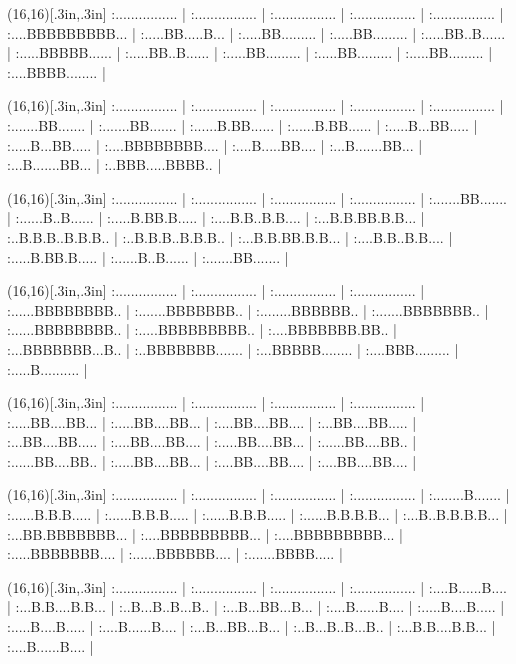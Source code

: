 \sprite{\Fuel}(16,16)[.3in,.3in]
:................ |
:................ |
:................ |
:................ |
:................ |
:....BBBBBBBBB... |
:.....BB.....B... |
:.....BB......... |
:.....BB......... |
:.....BB..B...... |
:.....BBBBB...... |
:.....BB..B...... |
:.....BB......... |
:.....BB......... |
:.....BB......... |
:....BBBB........ |
\endsprite


\sprite{\Armor}(16,16)[.3in,.3in]
:................ |
:................ |
:................ |
:................ |
:................ |
:.......BB....... |
:.......BB....... |
:......B.BB...... |
:......B.BB...... |
:.....B...BB..... |
:.....B...BB..... |
:....BBBBBBBB.... |
:....B.....BB.... |
:...B.......BB... |
:...B.......BB... |
:..BBB.....BBBB.. |
\endsprite

\sprite{\Goal}(16,16)[.3in,.3in]
:................ |
:................ |
:................ |
:................ |
:.......BB....... |
:......B..B...... |
:.....B.BB.B..... |
:....B.B..B.B.... |
:...B.B.BB.B.B... |
:..B.B.B..B.B.B.. |
:..B.B.B..B.B.B.. |
:...B.B.BB.B.B... |
:....B.B..B.B.... |
:.....B.BB.B..... |
:......B..B...... |
:.......BB....... |
\endsprite


\sprite{\Scroll}(16,16)[.3in,.3in]
:................ |
:................ |
:................ |
:................ |
:......BBBBBBBB.. |
:.......BBBBBBB.. |
:........BBBBBB.. |
:.......BBBBBBB.. |
:......BBBBBBBB.. |
:.....BBBBBBBBB.. |
:....BBBBBBB.BB.. |
:...BBBBBBB...B.. |
:..BBBBBBB....... |
:...BBBBB........ |
:....BBB......... |
:.....B.......... |
\endsprite


\sprite{\Slip}(16,16)[.3in,.3in]
:................ |
:................ |
:................ |
:................ |
:.....BB....BB... |
:.....BB....BB... |
:....BB....BB.... |
:...BB....BB..... |
:...BB....BB..... |
:....BB....BB.... |
:.....BB....BB... |
:......BB....BB.. |
:......BB....BB.. |
:.....BB....BB... |
:....BB....BB.... |
:....BB....BB.... |
\endsprite


\sprite{\Slow}(16,16)[.3in,.3in]
:................ |
:................ |
:................ |
:................ |
:........B....... |
:......B.B.B..... |
:......B.B.B..... |
:......B.B.B..... |
:......B.B.B.B... |
:...B..B.B.B.B... |
:...BB.BBBBBBB... |
:....BBBBBBBBB... |
:....BBBBBBBBB... |
:.....BBBBBBB.... |
:......BBBBBB.... |
:.......BBBB..... |
\endsprite


\sprite{\Start}(16,16)[.3in,.3in]
:................ |
:................ |
:................ |
:................ |
:....B......B.... |
:...B.B....B.B... |
:..B...B..B...B.. |
:...B...BB...B... |
:....B......B.... |
:.....B....B..... |
:.....B....B..... |
:....B......B.... |
:...B...BB...B... |
:..B...B..B...B.. |
:...B.B....B.B... |
:....B......B.... |
\endsprite


